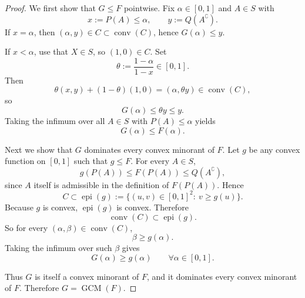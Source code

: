 \documentclass[10pt,a4paper]{amsart}
\begin{document}
\begin{proof}
We first show that $G\leqslant F$ pointwise. Fix $\alpha\in[0,1]$ and $A\in S$ with
\[
x:=P(A)\leqslant \alpha,
\qquad
y:=Q(A^{\complement}).
\]
If $x=\alpha$, then $(\alpha,y)\in C\subset \operatorname{conv}(C)$, hence $G(\alpha)\leqslant y$.

If $x<\alpha$, use that $X\in S$, so $(1,0)\in C$. Set
\[
\theta:=\frac{1-\alpha}{1-x}\in[0,1].
\]
Then
\[
\theta(x,y)+(1-\theta)(1,0)=(\alpha,\theta y)\in \operatorname{conv}(C),
\]
so
\[
G(\alpha)\leqslant \theta y\leqslant y.
\]
Taking the infimum over all $A\in S$ with $P(A)\leqslant \alpha$ yields
\[
G(\alpha)\leqslant F(\alpha).
\]

Next we show that $G$ dominates every convex minorant of $F$. Let $g$ be any convex function on
$[0,1]$ such that $g\leqslant F$. For every $A\in S$,
\[
g(P(A))\leqslant F(P(A))\leqslant Q(A^{\complement}),
\]
since $A$ itself is admissible in the definition of $F(P(A))$. Hence
\[
C\subset \operatorname{epi}(g):=\{(u,v)\in[0,1]^2:\ v\geqslant g(u)\}.
\]
Because $g$ is convex, $\operatorname{epi}(g)$ is convex. Therefore
\[
\operatorname{conv}(C)\subset \operatorname{epi}(g).
\]
So for every $(\alpha,\beta)\in \operatorname{conv}(C)$,
\[
\beta\geqslant g(\alpha).
\]
Taking the infimum over such $\beta$ gives
\[
G(\alpha)\geqslant g(\alpha)
\qquad\forall \alpha\in[0,1].
\]

Thus $G$ is itself a convex minorant of $F$, and it dominates every convex minorant of $F$.
Therefore $G=\operatorname{GCM}(F)$.
\end{proof}
\end{document}

